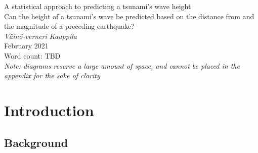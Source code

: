 \documentclass[11pt,letterpaper]{article}
\begin{document}
\doublespacing %



\begin{titlepage}
    \begin{center}
        \vspace*{4cm}
        A statistical approach to predicting a tsunami’s wave height \\
        \vspace{1cm}
        Can the height of a tsunami's wave be predicted based on the distance from and
        the magnitude of a preceding earthquake? \\
        \vspace{1cm}
        \textit{Väinö-verneri Kauppila} \\
        February 2021 \\
        \vspace{4cm}
        Word count: TBD \\
        \textit{Note: diagrams reserve a large amount of space, and cannot be placed in
            the appendix for the sake of clarity}
        \vfill
        \vspace{0.1cm}
    \end{center}
\end{titlepage}



\begin{center}
    \tableofcontents
    \vspace{1in}

\end{center}



\newpage


\section{Introduction}

\subsection{Background}
\end{document}
